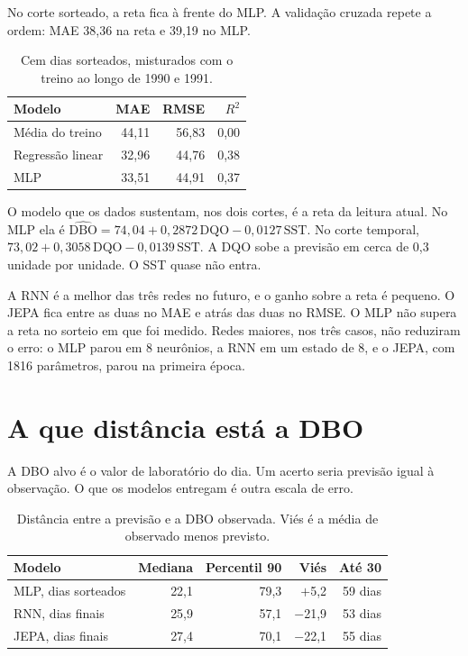 \documentclass[11pt,a4paper]{article}
\begin{document}
No corte sorteado, a reta fica à frente do MLP. A validação cruzada repete a ordem: MAE 38,36 na reta e 39,19 no MLP.

\begin{table}[ht]
\centering
\caption{Cem dias sorteados, misturados com o treino ao longo de 1990 e 1991.}
\begin{tabular}{lrrr}
\toprule
Modelo & MAE & RMSE & \(R^{2}\) \\
\midrule
Média do treino & 44,11 & 56,83 & 0,00 \\
Regressão linear & 32,96 & 44,76 & 0,38 \\
MLP & 33,51 & 44,91 & 0,37 \\
\bottomrule
\end{tabular}
\end{table}

O modelo que os dados sustentam, nos dois cortes, é a reta da leitura atual. No MLP ela é \(\widehat{\mathrm{DBO}} = 74{,}04 + 0{,}2872\,\mathrm{DQO} - 0{,}0127\,\mathrm{SST}\). No corte temporal, \(73{,}02 + 0{,}3058\,\mathrm{DQO} - 0{,}0139\,\mathrm{SST}\). A DQO sobe a previsão em cerca de 0,3 unidade por unidade. O SST quase não entra.

A RNN é a melhor das três redes no futuro, e o ganho sobre a reta é pequeno. O JEPA fica entre as duas no MAE e atrás das duas no RMSE. O MLP não supera a reta no sorteio em que foi medido. Redes maiores, nos três casos, não reduziram o erro: o MLP parou em 8 neurônios, a RNN em um estado de 8, e o JEPA, com 1816 parâmetros, parou na primeira época.

\section{A que distância está a DBO}

A DBO alvo é o valor de laboratório do dia. Um acerto seria previsão igual à observação. O que os modelos entregam é outra escala de erro.

\begin{table}[ht]
\centering
\caption{Distância entre a previsão e a DBO observada. Viés é a média de observado menos previsto.}
\begin{tabular}{lrrrr}
\toprule
Modelo & Mediana & Percentil 90 & Viés & Até 30 \\
\midrule
MLP, dias sorteados & 22,1 & 79,3 & \(+\)5,2 & 59 dias \\
RNN, dias finais & 25,9 & 57,1 & $-$21,9 & 53 dias \\
JEPA, dias finais & 27,4 & 70,1 & $-$22,1 & 55 dias \\
\bottomrule
\end{tabular}
\end{table}
\end{document}
